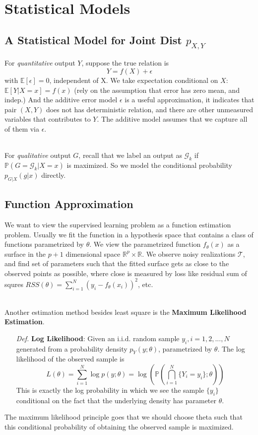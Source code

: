 \documentclass[a4paper, 11pt]{article}
\begin{document}
\section{Statistical Models}
\subsection{A Statistical Model for Joint Dist $p_{X,Y}$}
For \emph{quantitative} output $Y$, suppose the true relation is
$$
Y = f(X) + \epsilon
$$
with $\mathbb{E}\left[\epsilon\right] =0$, independent of X. We take expectation conditional on $X$: $\mathbb{E}\left[Y|X=x\right]=f(x)$ (rely on the assumption that error has zero mean, and indep.) And the additive error model $\epsilon$ is a useful approximation, it indicates that pair $(X,Y)$ does not has deterministic relation, and there are other unmeasured variables that contributes to $Y$. The additive model assumes that we capture all of them via $\epsilon$.

~\\
For \emph{qualitative} output $G$, recall that we label an output as $\mathcal{G}_k$ if $\mathbb{P}\left(G=\mathcal{G}_k|X=x\right)$ is maximized. So we model the conditional probability $p_{G|X}(g|x)$ directly. 

\subsection{Function Approximation} 
We want to view the supervised learning problem as a function estimation problem. Usually we fit the function in a hypothesis space that contains a class of functions parametrized by $\theta$. We view the parametrized function $f_{\theta}(x)$ as a surface in the $p+1$ dimensional space $\mathbb{R}^p \times \mathbb{R}$. We observe noisy realizations $\mathcal{T}$, and find set of parameters such that the fitted surface gets as close to the observed points as possible, where close is measured by loss like residual sum of squres $RSS(\theta) = \sum_{i=1}^N (y_i - f_{\theta}(x_i))^2$, etc.

~\\
Another estimation method besides least square is the \textbf{Maximum Likelihood Estimation}. 
\begin{itemize}
	\item[\textit{Def.}] \textbf{Log Likelihood}: Given an i.i.d. random sample $y_i, i=1,2,...,N$ generated from a probability density $p_Y(y;\theta)$, parametrized by $\theta$. The log likelihood of the observed sample is
	$$
	L(\theta) = \sum_{i=1}^N \log p(y;\theta) = \log \left(\mathbb{P}\left(\bigcap_{i=1}^{N}\{Y_i = y_i\}; \theta\right)\right)
	$$
	This is exactly the log probability in which we see the sample $\{y_i\}$ conditional on the fact that the underlying density has parameter $\theta$.
\end{itemize}
The maximum likelihood principle goes that we should choose theta such that this conditional probability of obtaining the observed sample is maximized. 
\end{document}
